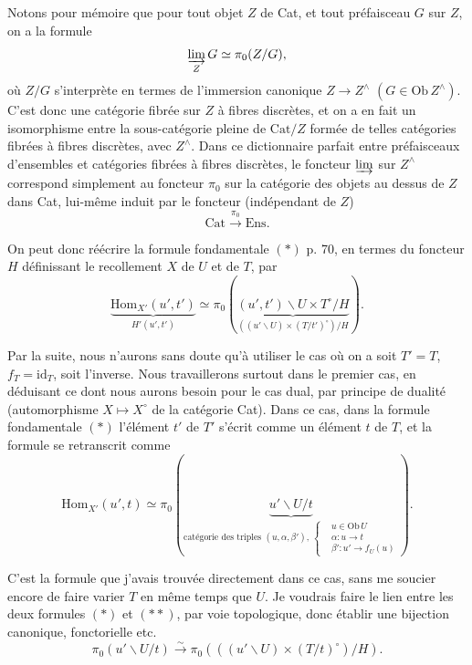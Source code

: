 \documentclass[11pt]{article}
\newcommand{\printedpage}[1]{\marginpar{\footnotesize p.~#1}}
\newcommand{\msp}[1]{\marginpar{\footnotesize [#1]}}
\newcommand{\Hom}{\mathrm{Hom}}
\newcommand{\Cat}{\mathrm{Cat}}
\newcommand{\Ens}{\mathrm{Ens}}
\newcommand{\id}{\mathrm{id}}
\newcommand{\Ob}{\mathrm{Ob}\,}
\begin{document}
Notons pour mémoire que pour tout objet $Z$ de Cat, et tout préfaisceau $G$ sur $Z$, on a la formule
\[
\varinjlim_{Z} G \simeq \pi_0(Z/G),
\]
où $Z/G$ s'interprète en termes de l'immersion canonique $Z\longrightarrow Z^{\wedge}$ $(G\in \Ob Z^{\wedge})$. C'est donc une catégorie fibrée sur $Z$ à fibres discrètes, et on a en fait un isomorphisme entre la sous-catégorie pleine de $\Cat/Z$ formée de telles catégories fibrées à fibres discrètes, avec $Z^{\wedge}$. Dans ce dictionnaire parfait entre préfaisceaux d'ensembles et catégories fibrées à fibres discrètes, le foncteur $\varinjlim$ sur $Z^{\wedge}$ correspond simplement au foncteur $\pi_0$ sur la catégorie des objets au dessus de $Z$ dans Cat, lui-même induit par le foncteur (indépendant de $Z$)
\[
\Cat \xrightarrow{\pi_0} \Ens.
\]

\msp{page 72} On peut donc réécrire la formule fondamentale $(*)$ p. 70, en termes du foncteur $H$ définissant le recollement $X$ de $U$ et de $T$, par
\[
\boxed{\underbrace{\Hom_{X'}(u',t')}_{H'(u',t')} \simeq \pi_0(\underbrace{(u',t')\backslash U\times T^{\circ}/H}_{((u'\backslash U)\times(T/t')^{\circ})/H}).}
\tag*{$(*)$}
\]

Par la suite, nous n'aurons sans doute qu'à utiliser le cas où on a soit $T'=T$, $f_T=\id_T$, soit l'inverse. Nous travaillerons surtout dans le premier cas, en déduisant ce dont nous aurons besoin pour le cas dual, par principe de dualité (automorphisme $X\longmapsto X^{\circ}$ de la
\printedpage{52}
catégorie Cat). Dans ce cas, dans la formule fondamentale $(*)$ l'élément $t'$ de $T'$ s'écrit comme un élément $t$ de $T$, et la formule se retranscrit comme
\[
\boxed{\Hom_{X'}(u',t) \simeq \pi_0(\underbrace{u'\backslash U/t}_{\text{catégorie des triples } (u,\alpha,\beta'),\ \left\{\begin{aligned} &u\in \Ob U\\ &\alpha : u\longrightarrow t\\ &\beta' : u'\longrightarrow f_U(u)\end{aligned}\right.}).}
\tag*{$(**)$}
\]

C'est la formule que j'avais trouvée directement dans ce cas, sans me soucier encore de faire varier $T$ en même temps que $U$. Je voudrais faire le lien entre les deux formules $(*)$ et $(**)$, par voie topologique, donc établir une bijection canonique, fonctorielle etc.
\[
\pi_0(u'\backslash U/t) \xrightarrow{\sim} \pi_0(((u'\backslash U)\times(T/t)^{\circ})/H).
\]
\end{document}
